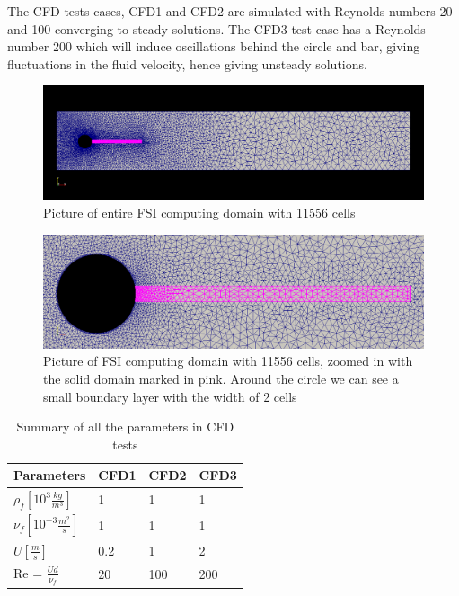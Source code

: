 The CFD tests cases, CFD1 and CFD2  are simulated with Reynolds numbers 20 and 100 converging to steady solutions. The CFD3 test case has a Reynolds number 200 which will induce oscillations behind the circle and bar, giving fluctuations in the fluid velocity, hence giving unsteady solutions.

\begin{figure}[H]
\centering
\includegraphics[scale=0.40,trim={20mm 34mm 20mm 30mm},clip]{./Verification_Validation/Hron_Turek/FSI_domain_b2.png}
\caption{Picture of entire FSI computing domain with 11556 cells}
\label{fig:fullmesh}
\end{figure}
\begin{figure}[H]
\centering
\includegraphics[scale=0.362,trim={0mm 0mm 0mm 0mm},clip]{./Verification_Validation/Hron_Turek/FSI_domain_b2_zoom.png}
\caption{Picture of FSI computing domain with 11556 cells, zoomed in with the solid domain marked in pink. Around the circle we can see a small boundary layer with the width of 2 cells}
\label{fig:partmesh}
\end{figure}

\vspace{1cm}

\begin{table}[H]
\centering
\caption{Summary of all the parameters in CFD tests}
\label{my-label}
\begin{tabular}{|l|l|l|l|}
\hline
Parameters & CFD1 & CFD2 & CFD3 \\ \hline
$\rho_f [10^3 \frac{kg}{m^3}]$ & 1 & 1 & 1 \\ \hline
$\nu_f [10^{-3} \frac{m^2}{s}]$ & 1 & 1 & 1 \\ \hline
$ U [\frac{m}{s}] $ & 0.2 & 1 & 2 \\ \hline
Re = $\frac{Ud}{\nu_f}$ & 20 & 100 & 200 \\ \hline
\end{tabular}
\end{table}


